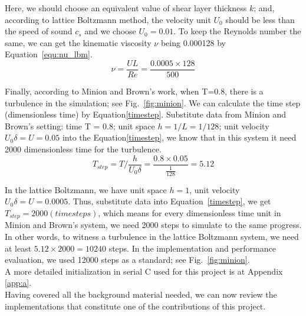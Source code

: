 Here, we should choose an equivalent value of shear layer thickness $k$; and, according to lattice Boltzmann method, the velocity unit $U_0$ should be less than the speed of sound $c_s$ and we choose $U_0 = 0.01$. To keep the Reynolds number the same, we can get the kinematic viscosity $\nu$ being 0.000128 by Equation~\ref{equ:nu_lbm}.\\

\begin{equation}
    \label{equ:nu_lbm}
    \nu = \frac{UL}{Re} = \frac{0.0005 \times 128}{500}  
\end{equation}

Finally, according to Minion and Brown's work, when T=0.8, there is a turbulence in the simulation; see Fig.~\ref{fig:minion}. We can calculate the time step (dimensionless time) by Equation\ref{timestep}. Substitute data from Minion and Brown's setting: time T = 0.8;  unit space $h=1/L=1/128$; unit velocity $U_0 \delta=U=0.05$  into the Equation\ref{timestep}, we know that in this system it need 2000 dimensionless time for the turbulence.\\

\begin{equation}
\label{timestep}
    T_{step} = T / \frac{h}{U_0 \delta} = \frac{0.8 \times 0.05}{ \frac{1}{128}}= 5.12
\end{equation}

In the lattice Boltzmann, we have unit space $h=1$, unit velocity $U_0 \delta = U = 0.0005$. Thus, substitute data into Equation~\ref{timestep}, we get $T_{step} = 2000 (timesteps)$, which means for every dimensionless time unit in Minion and Brown's system, we need 2000 steps to simulate to the same progress. In other words, to witness a turbulence in the lattice Boltzmann system, we need at least $5.12 \times 2000 = 10240$ steps. In the implementation and performance evaluation, we used 12000 steps as a standard; see Fig.~\ref{fig:minion}.\\

A more detailed initialization in serial C used for this project is at Appendix \ref{app:a}.\\


\vspace*{+3.2cm}
Having covered all the background material needed, we can now review the implementations that constitute one of the contributions of this project.

